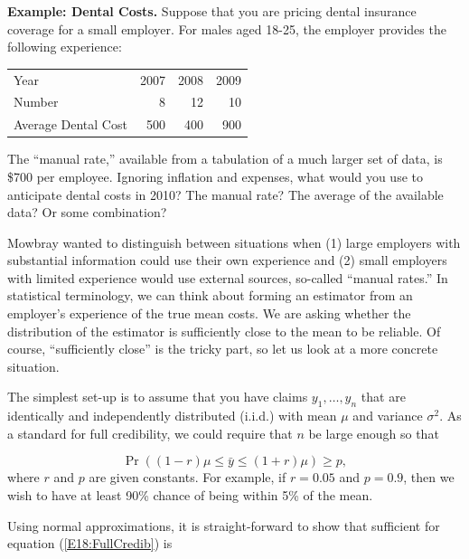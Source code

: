 \linejed

\textbf{Example: Dental Costs.} Suppose that you are pricing dental
insurance coverage for a small employer. For males aged 18-25, the
employer provides the following experience:
\begin{center}
\begin{tabular}{lrrr}
  \hline
  Year & 2007 & 2008 & 2009 \\
  Number & 8 & 12 & 10 \\
  Average Dental Cost & 500 & 400 & 900 \\
  \hline
\end{tabular}\end{center}

\noindent The ``manual rate,'' available from a tabulation of a much
larger set of data, is \$700 per employee. Ignoring inflation and
expenses, what would you use to anticipate dental costs in 2010? The
manual rate? The average of the available data? Or some combination?


\linejed

Mowbray wanted to distinguish between situations when (1) large
employers with substantial information could use their own
experience and (2) small employers with limited experience would use
external sources, so-called ``manual rates.'' In statistical
terminology, we can think about forming an estimator from an
employer's experience of the true mean costs. We are asking whether
the distribution of the estimator is sufficiently close to the mean
to be reliable. Of course, ``sufficiently close'' is the tricky
part, so let us look at a more concrete situation.

The simplest set-up is to assume that you have claims $y_1, \ldots,
y_n$ that are identically and independently distributed (i.i.d.)
with mean $\mu$ and variance $\sigma^2$. As a standard for full
credibility, we could require that $n$ be large enough so that

\begin{equation}\label{E18:FullCredib}
\Pr ( (1-r) \mu \leq \bar{y} \leq (1+r) \mu) \geq p,
\end{equation}
where $r$ and $p$ are given constants. For example, if $r=0.05$ and
$p=0.9$, then we wish to have at least 90\% chance of being within
5\% of the mean.

Using normal approximations, it is straight-forward to show that
sufficient for equation (\ref{E18:FullCredib}) is

